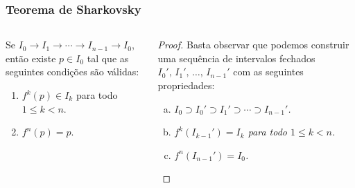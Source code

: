 \begin{frame}
\vspace{5pt}
\frametitle{Teorema de Sharkovsky}
\begin{columns}
\column{\dimexpr\paperwidth-15pt}

\begin{lemma}
Se $I_0 \longrightarrow I_1 \longrightarrow \cdots \longrightarrow I_{n-1} \longrightarrow I_0$, então existe $p \in I_0$ tal que as seguintes condições são válidas:
\begin{enumerate}
\item $f^k(p) \in I_k$ para todo $1 \leq k < n$.
\item $f^n(p) = p$.
\end{enumerate}
\end{lemma}

\begin{proof}
Basta observar que podemos construir uma sequência de intervalos fechados $I_0', \, I_1', \, \dots, \, I_{n-1}'$ com as seguintes propriedades:
\begin{enumerate}[a)]
\item \textit{$I_0 \supset I_0' \supset I_1' \supset \cdots \supset I_{n-1}'$.}
\item \textit{$f^k(I_{k-1}') = I_k$ para todo $1 \leq k < n$.}
\item \textit{$f^n(I_{n-1}') = I_0$.}
\qedhere
\end{enumerate}

\end{proof}

\end{columns}
\end{frame}


